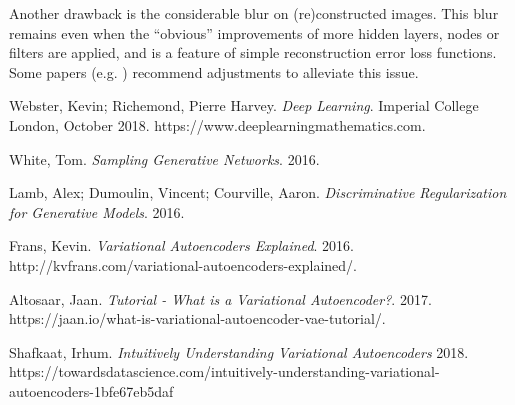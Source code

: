 \documentclass[]{article}
\begin{document}
Another drawback is the considerable blur on (re)constructed images. This blur remains even when the ``obvious'' improvements of more hidden layers, nodes or filters are applied, and is a feature of simple reconstruction error loss functions. Some papers (e.g. \cite{lamb}) recommend adjustments to alleviate this issue.




\begin{thebibliography}{9}
          
  Webster, Kevin; Richemond, Pierre Harvey.
  \textit{Deep Learning}.
  Imperial College London, October 2018.
  https://www.deeplearningmathematics.com.

  White, Tom.
  \textit{Sampling Generative Networks}.
  2016.
  
  Lamb, Alex; Dumoulin, Vincent; Courville, Aaron.
  \textit{Discriminative Regularization for Generative Models}.
  2016.

  Frans, Kevin.
  \textit{Variational Autoencoders Explained}.
  2016.
  http://kvfrans.com/variational-autoencoders-explained/.

  Altosaar, Jaan.
  \textit{Tutorial - What is a Variational Autoencoder?}.
  2017.
  https://jaan.io/what-is-variational-autoencoder-vae-tutorial/.

  Shafkaat, Irhum.
  \textit{Intuitively Understanding Variational Autoencoders}
  2018.
  https://towardsdatascience.com/intuitively-understanding-variational-autoencoders-1bfe67eb5daf
  
  
\end{thebibliography}
\end{document}
